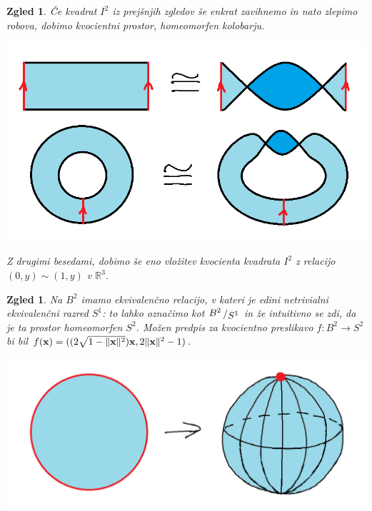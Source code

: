\documentclass[10pt, a4paper]{article}
\newtheorem{zgled}[izr]{Zgled}
\newcommand{\R}{\mathbb {R}}
\newcommand{\quot}[2]{{\raisebox{0.1em}{$#1$}\left/\raisebox{-0.2em}{$#2$}\right.}}
\begin{document}
\begin{zgled}\label{zgl:2}
  Če kvadrat $I^2$ iz prejšnjih zgledov še enkrat zavihnemo in nato zlepimo robova,
  dobimo kvocientni prostor, homeomorfen kolobarju.
  \begin{center}
  \includegraphics[scale=0.4]{zgled3.png}    
  \end{center}
  Z drugimi besedami, dobimo še eno vložitev 
  kvocienta kvadrata $I^2$ z relacijo 
  $(0, y) \sim (1, y)$ v $\R^3$.
\end{zgled}

\begin{zgled}\label{zgl:1}
  Na $B^2$ imamo ekvivalenčno relacijo, v kateri je edini netrivialni ekvivalenčni razred $S^1$:
    to lahko označimo kot $\quot{B^2}{S^1}$ in že intuitivno se zdi, da je ta prostor homeomorfen $S^2$.
    Možen predpis za kvocientno preslikavo $f: B^2 \to S^2$ bi bil
    $f(\vb{x}) = ((2 \sqrt{1 - \|\vb{x}\|^2}) \vb{x}, 2\|\vb{x}\|^2 - 1)$.
    \begin{center}
      \includegraphics[scale=0.4]{zgled4.png}
    \end{center}
\end{zgled}
\end{document}
